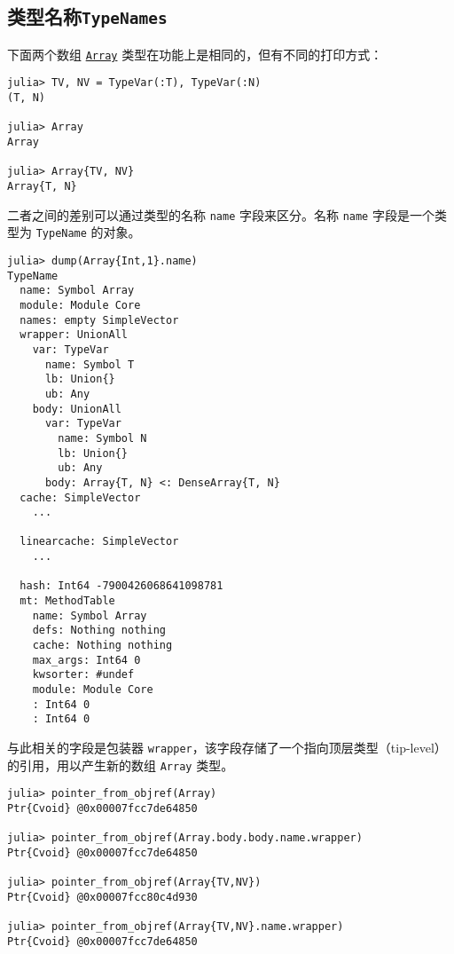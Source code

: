 \subsection{类型名称\texttt{TypeNames}}



下面两个数组 \hyperlink{15492651498431872487}{\texttt{Array}} 类型在功能上是相同的，但有不同的打印方式：




\begin{verbatim}
julia> TV, NV = TypeVar(:T), TypeVar(:N)
(T, N)

julia> Array
Array

julia> Array{TV, NV}
Array{T, N}
\end{verbatim}



二者之间的差别可以通过类型的名称 \texttt{name} 字段来区分。名称 \texttt{name} 字段是一个类型为 \texttt{TypeName} 的对象。




\begin{verbatim}
julia> dump(Array{Int,1}.name)
TypeName
  name: Symbol Array
  module: Module Core
  names: empty SimpleVector
  wrapper: UnionAll
    var: TypeVar
      name: Symbol T
      lb: Union{}
      ub: Any
    body: UnionAll
      var: TypeVar
        name: Symbol N
        lb: Union{}
        ub: Any
      body: Array{T, N} <: DenseArray{T, N}
  cache: SimpleVector
    ...

  linearcache: SimpleVector
    ...

  hash: Int64 -7900426068641098781
  mt: MethodTable
    name: Symbol Array
    defs: Nothing nothing
    cache: Nothing nothing
    max_args: Int64 0
    kwsorter: #undef
    module: Module Core
    : Int64 0
    : Int64 0
\end{verbatim}



与此相关的字段是包装器 \texttt{wrapper}，该字段存储了一个指向顶层类型（tip-level）的引用，用以产生新的数组 \texttt{Array} 类型。




\begin{verbatim}
julia> pointer_from_objref(Array)
Ptr{Cvoid} @0x00007fcc7de64850

julia> pointer_from_objref(Array.body.body.name.wrapper)
Ptr{Cvoid} @0x00007fcc7de64850

julia> pointer_from_objref(Array{TV,NV})
Ptr{Cvoid} @0x00007fcc80c4d930

julia> pointer_from_objref(Array{TV,NV}.name.wrapper)
Ptr{Cvoid} @0x00007fcc7de64850
\end{verbatim}



